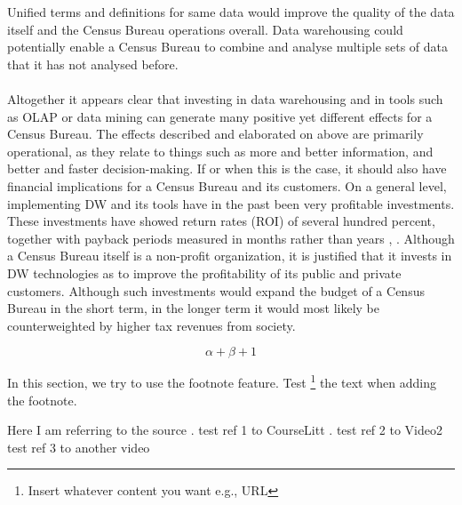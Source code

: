 Unified terms and definitions for same data would improve the quality of the data itself and the Census Bureau operations overall.
Data warehousing could potentially enable a Census Bureau to combine and analyse multiple sets of data that it has not analysed before.
\\\\ 
Altogether it appears clear that investing in data warehousing and in tools such as OLAP or data mining can generate many positive yet 
different effects for a Census Bureau. 
The effects described and elaborated on above are primarily operational, as they relate to things such as more and better information,
and better and faster decision-making. 
If or when this is the case, it should also have financial implications for a Census Bureau and its customers.
On a general level, implementing DW and its tools have in the past been very profitable investments. 
These investments have showed return rates (ROI) of several hundred percent,
together with payback periods measured in months rather than years \cite[chapter~31.1.3]{CourseLitt}, \cite{l2video}. 
Although a Census Bureau itself is a non-profit organization, 
it is justified that it invests in DW technologies as to improve the profitability of its public and private customers. 
Although such investments would expand the budget of a Census Bureau in the short term, 
in the longer term it would most likely be counterweighted by higher tax revenues from society.


\newpage 
\begin{equation}
\alpha + \beta + 1
\end{equation}

In this section, we try to use the footnote feature. 
Test \footnote{Insert whatever content you want e.g., URL} the text when adding the footnote.

Here I am referring to the source \cite{DataScience}.
test ref 1 to CourseLitt \cite{CourseLitt}.
test ref 2 to Video2 \cite{l2video}
test ref 3 to another video \cite{l3video}